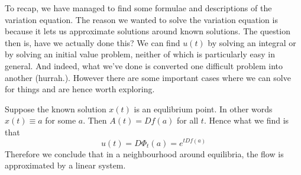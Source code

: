 To recap, we have managed to find some formulae and descriptions of the variation equation. The reason we wanted to solve the variation equation is because it lets us approximate solutions around known solutions. The question then is, have we actually done this? We can find $u(t)$ by solving an integral or by solving an initial value problem, neither of which is particularly easy in general. And indeed, what we've done is converted one difficult problem into another (hurrah.). However there are some important cases where we can solve for things and are hence worth exploring.

Suppose the known solution $x(t)$ is an equlibrium point. In other words $x(t) \equiv a$ for some $a$. Then $A(t) = Df(a)$ for all $t$. Hence what we find is that
$$ u(t) = D\Phi_t(a) = e^{t Df(a)} $$
Therefore we conclude that in a neighbourhood around equilibria, the flow is approximated by a linear system.